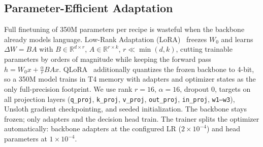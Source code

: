 \subsection{Parameter-Efficient Adaptation}
Full finetuning of 350M parameters per recipe is wasteful when the backbone
already models language. Low-Rank Adaptation (LoRA)~\cite{hu2021lora} freezes
$W_0$ and learns $\Delta W = BA$ with $B\in\mathbb{R}^{d\times r}$,
$A\in\mathbb{R}^{r\times k}$, $r\ll\min(d,k)$, cutting trainable parameters by
orders of magnitude while keeping the forward pass
$h = W_0x + \frac{\alpha}{r}BAx$. QLoRA~\cite{dettmers2023qlora} additionally
quantizes the frozen backbone to 4-bit, so a 350M model trains in T4 memory
with adapters and optimizer states as the only full-precision footprint.
We use rank $r=16$, $\alpha=16$, dropout $0$, targets on all projection layers
(\texttt{q\_proj}, \texttt{k\_proj}, \texttt{v\_proj}, \texttt{out\_proj},
\texttt{in\_proj}, \texttt{w1--w3}), Unsloth gradient checkpointing, and seeded
initialization. The backbone stays frozen; only adapters and the decision head
train. The trainer splits the optimizer automatically: backbone adapters at the
configured LR ($2\times10^{-4}$) and head parameters at $1\times10^{-4}$.

